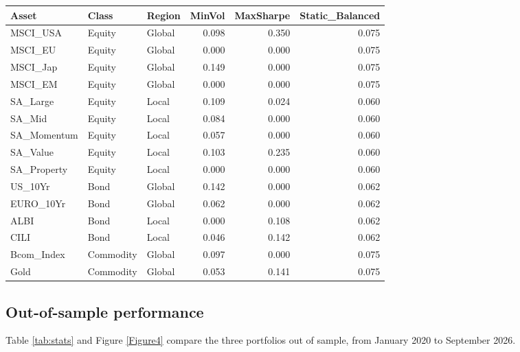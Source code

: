 \documentclass[11pt,preprint]{elsarticle}
\let\origtable\table
\let\endorigtable\endtable
\renewenvironment{table}[1][2] {
    \expandafter\origtable\expandafter[H]
} {
    \endorigtable
}
\numberwithin{equation}{section}
\numberwithin{figure}{section}
\numberwithin{table}{section}
\begin{document}
\begin{table}[!htbp]
\centering
\caption{Weights at the latest rebalance (June 2026)} 
\label{tab:latest}
\begingroup\scriptsize
\begin{tabular}{lllrrr}
  \hline
Asset & Class & Region & MinVol & MaxSharpe & Static\_Balanced \\ 
  \hline
MSCI\_USA & Equity & Global & 0.098 & 0.350 & 0.075 \\ 
  MSCI\_EU & Equity & Global & 0.000 & 0.000 & 0.075 \\ 
  MSCI\_Jap & Equity & Global & 0.149 & 0.000 & 0.075 \\ 
  MSCI\_EM & Equity & Global & 0.000 & 0.000 & 0.075 \\ 
  SA\_Large & Equity & Local & 0.109 & 0.024 & 0.060 \\ 
  SA\_Mid & Equity & Local & 0.084 & 0.000 & 0.060 \\ 
  SA\_Momentum & Equity & Local & 0.057 & 0.000 & 0.060 \\ 
  SA\_Value & Equity & Local & 0.103 & 0.235 & 0.060 \\ 
  SA\_Property & Equity & Local & 0.000 & 0.000 & 0.060 \\ 
  US\_10Yr & Bond & Global & 0.142 & 0.000 & 0.062 \\ 
  EURO\_10Yr & Bond & Global & 0.062 & 0.000 & 0.062 \\ 
  ALBI & Bond & Local & 0.000 & 0.108 & 0.062 \\ 
  CILI & Bond & Local & 0.046 & 0.142 & 0.062 \\ 
  Bcom\_Index & Commodity & Global & 0.097 & 0.000 & 0.075 \\ 
  Gold & Commodity & Global & 0.053 & 0.141 & 0.075 \\ 
   \hline
\end{tabular}
\endgroup
\end{table}

\subsection{Out-of-sample performance}\label{out-of-sample-performance}

Table \ref{tab:stats} and Figure \ref{Figure4} compare the three
portfolios out of sample, from January 2020 to September 2026.
\end{document}
